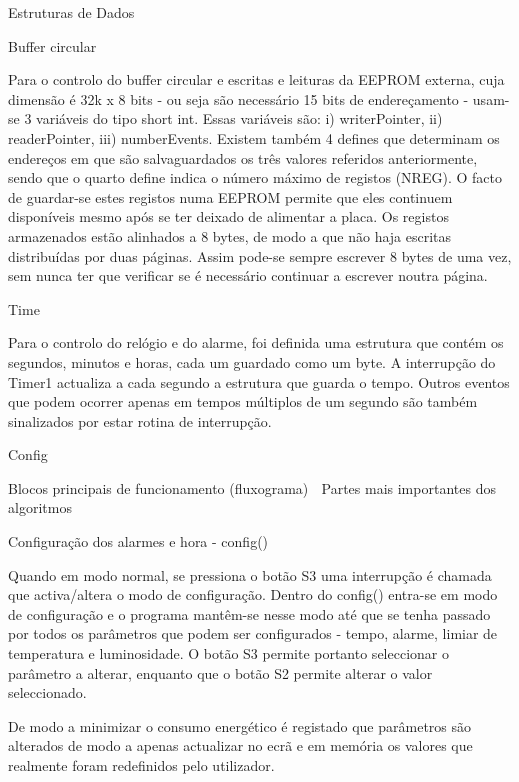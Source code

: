 \documentclass[a4paper,12pt]{article}
\begin{document}
	

	\tableofcontents
	\pagebreak




Estruturas de Dados

Buffer circular

Para o controlo do buffer circular e escritas e leituras da EEPROM externa, cuja dimensão é 32k x 8 bits - ou seja são necessário 15 bits de endereçamento - usam-se 3 variáveis do tipo short int. Essas variáveis são: i) writerPointer, ii) readerPointer, iii) numberEvents.  Existem também 4 defines que determinam os endereços em que são salvaguardados os três valores referidos anteriormente, sendo que o quarto define indica o número máximo de registos (NREG). O facto de guardar-se estes registos numa EEPROM permite que eles continuem disponíveis mesmo após se ter deixado de alimentar a placa. Os registos armazenados estão alinhados a 8 bytes, de modo a que não haja escritas distribuídas por duas páginas. Assim pode-se sempre escrever 8 bytes de uma vez, sem nunca ter que verificar se é necessário continuar a escrever noutra página.

Time

Para o controlo do relógio e do alarme, foi definida uma estrutura que contém os segundos, minutos e horas, cada um guardado como um byte. A interrupção do Timer1 actualiza a cada segundo a estrutura que guarda o tempo. Outros eventos que podem ocorrer apenas em tempos múltiplos de um segundo são também sinalizados por estar rotina de interrupção.

Config



Blocos principais de funcionamento (fluxograma)

Partes mais importantes dos algoritmos

Configuração dos alarmes e hora - config()


Quando em modo normal, se pressiona o botão S3 uma interrupção é chamada que activa/altera o modo de configuração. Dentro do config() entra-se em modo de configuração e o programa mantêm-se nesse modo até que se tenha passado por todos os parâmetros que podem ser configurados - tempo, alarme, limiar de temperatura e luminosidade. O botão S3 permite portanto seleccionar o parâmetro a alterar, enquanto que o botão S2 permite alterar o valor seleccionado.

De modo a minimizar o consumo energético é registado que parâmetros são alterados de modo a apenas actualizar no ecrã e em memória os valores que realmente foram redefinidos pelo utilizador.
\end{document}
